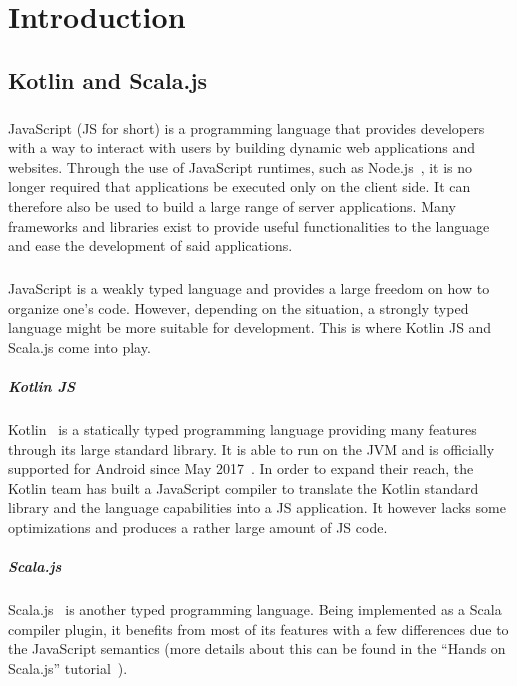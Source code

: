 \chapter{Introduction}
\section{Kotlin and Scala.js}

\paragraph{} JavaScript (JS for short) is a programming language that provides developers with a 
way to interact with users by building dynamic web applications and websites. Through the use of 
JavaScript runtimes, such as Node.js~\cite{nodejs}, it is no longer required that applications be 
executed only on the client side. It can therefore also be used to build a large range of 
server applications. Many frameworks and libraries exist to provide useful functionalities to the 
language and ease the development of said applications.

\paragraph{} JavaScript is a weakly typed  language and provides a large freedom on how to organize
one's code. However, depending on the situation, a strongly typed language might be more suitable for development. This is where Kotlin JS and Scala.js come into play.

\paragraph{Kotlin JS} Kotlin~\cite{kotlin} is a statically typed programming language providing 
many features through its large standard library. It is able to run on the JVM and is officially 
supported for Android since May 2017~\cite{android_kotlin_support}. In order to expand their reach, 
the Kotlin team has built a JavaScript compiler to translate the Kotlin standard library 
and the language capabilities into a JS application. It however lacks some optimizations and 
produces a rather large amount of JS code.

\paragraph{Scala.js} Scala.js~\cite{scalajs} is another typed programming language. Being 
implemented as a Scala compiler plugin, it benefits from most of its features with a few 
differences due to the JavaScript semantics (more details about this can be found in the 
\enquote{Hands on Scala.js} tutorial~\cite{scalajs_handson}).


